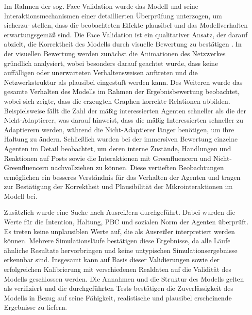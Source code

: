 \documentclass[runningheads]{llncs}
\begin{document}
Im Rahmen der sog. Face Validation wurde das Modell und seine Interaktionsmechanismen einer detaillierten Überprüfung unterzogen, um sicherzu- stellen, dass die beobachteten Effekte plausibel und das Modellverhalten erwartungsgemäß sind. Die Face Validation ist ein qualitativer Ansatz, der darauf abzielt, die Korrektheit des Modells durch visuelle Bewertung zu bestätigen \cite{klugl_validation_2008}. In der visuellen Bewertung werden zunächst die Animationen des Netzwerkes gründlich analysiert, wobei besonders darauf geachtet wurde, dass keine auffälligen oder unerwarteten Verhaltensweisen auftreten und die Netzwerkstruktur als plausibel eingestuft werden kann.
Des Weiteren wurde das gesamte Verhalten des Modells im Rahmen der Ergebnisbewertung beobachtet, wobei sich zeigte, dass die erzeugten Graphen korrekte Relationen abbilden. Beispielsweise fällt die Zahl der mäßig interessierten Agenten schneller als die der Nicht-Adaptierer, was darauf hinweist, dass die mäßig Interessierten schneller zu Adaptierern werden, während die Nicht-Adaptierer länger benötigen, um ihre Haltung zu ändern. Schließlich wurden bei der immersiven Bewertung einzelne Agenten im Detail beobachtet, um deren interne Zustände, Handlungen und Reaktionen auf Posts sowie die Interaktionen mit Greenfluencern und Nicht-Greenfluencern nachvollziehen zu können. Diese vertieften Beobachtungen ermöglichen ein besseres Verständnis für das Verhalten der Agenten und tragen zur Bestätigung der Korrektheit und Plausibilität der Mikrointeraktionen im Modell bei.
 
Zusätzlich wurde eine Suche nach Ausreißern durchgeführt. Dabei wurden die Werte für die Intention, Haltung, PBC und sozialen Norm der Agenten überprüft. Es treten keine unplausiblen Werte auf, die als Ausreißer interpretiert werden können. Mehrere Simulationsläufe bestätigen diese Ergebnisse, da alle Läufe ähnliche Resultate hervorbringen und keine untypischen Simulationsergebnisse erkennbar sind.
Insgesamt kann auf Basis dieser Validierungen sowie der erfolgreichen Kalibrierung mit verschiedenen Realdaten auf die Validität des Modells geschlossen werden. Die Annahmen und die Struktur des Modells gelten als verifiziert und die durchgeführten Tests bestätigen die Zuverlässigkeit des Modells in Bezug auf seine Fähigkeit, realistische und plausibel erscheinende Ergebnisse zu liefern.


\end{document}
